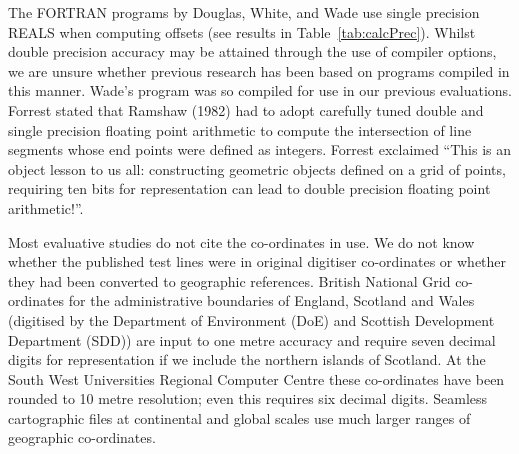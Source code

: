 \documentclass{egpubl}
\begin{document}
The FORTRAN programs by Douglas, White, and Wade use single precision REALS
when computing offsets (see results in Table~\ref{tab:calcPrec}). Whilst
double precision accuracy may be attained through the use of compiler
options, we are unsure whether previous research has been based on programs
compiled in this manner. Wade's program was so compiled for use in our
previous evaluations. Forrest stated that Ramshaw (1982) had to adopt
carefully tuned double and single precision floating point arithmetic to
compute the intersection of line segments whose end points were defined as
integers. Forrest exclaimed ``This is an object lesson to us all:
constructing geometric objects defined on a grid of points, requiring ten
bits for representation can lead to double precision floating point
arithmetic!''.

Most evaluative studies do not cite the co-ordinates in use. We do not know
whether the published test lines were in original digitiser co-ordinates or
whether they had been converted to geographic references. British National
Grid co-ordinates for the administrative boundaries of England, Scotland and
Wales (digitised by the Department of Environment (DoE) and Scottish
Development Department (SDD)) are input to one metre accuracy and require
seven decimal digits for representation if we include the northern islands of
Scotland. At the South West Universities Regional Computer Centre these
co-ordinates have been rounded to 10 metre resolution; even this requires six
decimal digits. Seamless cartographic files at continental and global scales
use much larger ranges of geographic co-ordinates.
\end{document}
